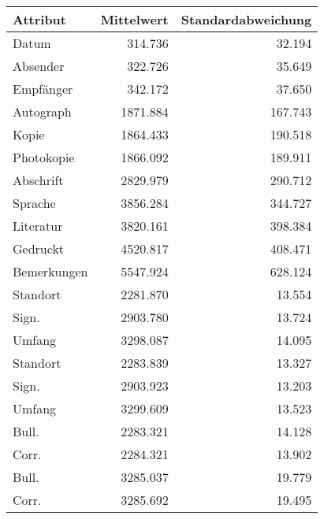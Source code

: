 \begin{tabular}{lrr}
\toprule
    Attribut &  Mittelwert &  Standardabweichung \\
\midrule
       Datum &     314.736 &              32.194 \\
    Absender &     322.726 &              35.649 \\
   Empfänger &     342.172 &              37.650 \\
   Autograph &    1871.884 &             167.743 \\
       Kopie &    1864.433 &             190.518 \\
  Photokopie &    1866.092 &             189.911 \\
   Abschrift &    2829.979 &             290.712 \\
     Sprache &    3856.284 &             344.727 \\
   Literatur &    3820.161 &             398.384 \\
    Gedruckt &    4520.817 &             408.471 \\
 Bemerkungen &    5547.924 &             628.124 \\
    Standort &    2281.870 &              13.554 \\
       Sign. &    2903.780 &              13.724 \\
      Umfang &    3298.087 &              14.095 \\
    Standort &    2283.839 &              13.327 \\
       Sign. &    2903.923 &              13.203 \\
      Umfang &    3299.609 &              13.523 \\
       Bull. &    2283.321 &              14.128 \\
       Corr. &    2284.321 &              13.902 \\
       Bull. &    3285.037 &              19.779 \\
       Corr. &    3285.692 &              19.495 \\
\bottomrule
\end{tabular}